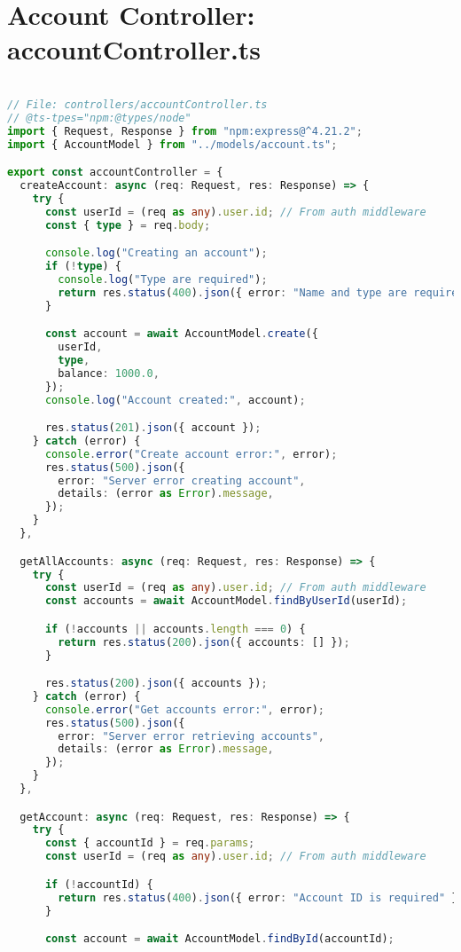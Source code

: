 \section{Account Controller: accountController.ts}
\begin{lstlisting}[language=TypeScript]

// File: controllers/accountController.ts
// @ts-tpes="npm:@types/node"
import { Request, Response } from "npm:express@^4.21.2";
import { AccountModel } from "../models/account.ts";

export const accountController = {
  createAccount: async (req: Request, res: Response) => {
    try {
      const userId = (req as any).user.id; // From auth middleware
      const { type } = req.body;

      console.log("Creating an account");
      if (!type) {
        console.log("Type are required");
        return res.status(400).json({ error: "Name and type are required" });
      }

      const account = await AccountModel.create({
        userId,
        type,
        balance: 1000.0,
      });
      console.log("Account created:", account);

      res.status(201).json({ account });
    } catch (error) {
      console.error("Create account error:", error);
      res.status(500).json({
        error: "Server error creating account",
        details: (error as Error).message,
      });
    }
  },

  getAllAccounts: async (req: Request, res: Response) => {
    try {
      const userId = (req as any).user.id; // From auth middleware
      const accounts = await AccountModel.findByUserId(userId);

      if (!accounts || accounts.length === 0) {
        return res.status(200).json({ accounts: [] });
      }

      res.status(200).json({ accounts });
    } catch (error) {
      console.error("Get accounts error:", error);
      res.status(500).json({
        error: "Server error retrieving accounts",
        details: (error as Error).message,
      });
    }
  },

  getAccount: async (req: Request, res: Response) => {
    try {
      const { accountId } = req.params;
      const userId = (req as any).user.id; // From auth middleware

      if (!accountId) {
        return res.status(400).json({ error: "Account ID is required" });
      }

      const account = await AccountModel.findById(accountId);


\end{lstlisting}

